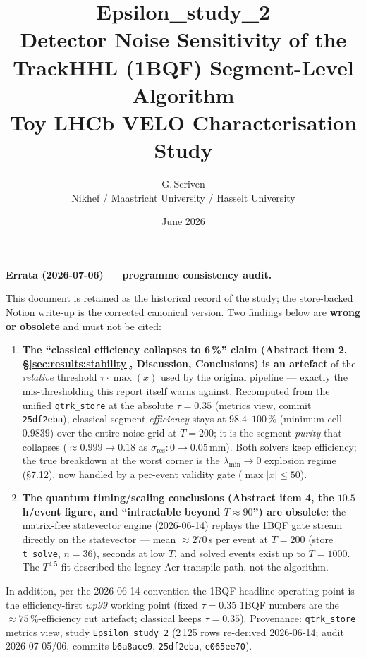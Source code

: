 \documentclass[11pt,a4paper]{article}
\title{%
  \textbf{Epsilon\_study\_2}\\[4pt]
  \large Detector Noise Sensitivity of the TrackHHL (1BQF)
  Segment-Level Algorithm\\[2pt]
  \normalsize Toy LHCb VELO Characterisation Study
}
\author{G.\,Scriven\\[2pt]
  \small Nikhef / Maastricht University / Hasselt University}
\date{June 2026}
\newcommand{\sres}{\sigma_{\mathrm{res}}}
\newcommand{\ntrk}{T}
\newcommand{\codepath}[1]{\texttt{#1}}
\begin{document}
\maketitle
\thispagestyle{fancy}

\begin{center}
\setlength{\fboxsep}{8pt}%
\colorbox{red!8}{\begin{minipage}{0.86\linewidth}
\textbf{Errata (2026-07-06) — programme consistency audit.}\par\smallskip
This document is retained as the historical record of the study; the store-backed
Notion write-up is the corrected canonical version. Two findings below are
\textbf{wrong or obsolete} and must not be cited:
\begin{enumerate}[noitemsep,topsep=2pt]
  \item \textbf{The ``classical efficiency collapses to 6\,\%'' claim (Abstract item 2,
        \S\ref{sec:results:stability}, Discussion, Conclusions) is an artefact} of the
        \emph{relative} threshold $\tau\cdot\max(x)$ used by the original pipeline —
        exactly the mis-thresholding this report itself warns against. Recomputed from
        the unified \codepath{qtrk\_store} at the absolute $\tau=0.35$ (metrics view,
        commit \codepath{25df2eba}), classical segment \emph{efficiency} stays at
        $98.4$--$100\,\%$ (minimum cell $0.9839$) over the entire noise grid at
        $\ntrk=200$; it is the segment
        \emph{purity} that collapses ($\approx\!0.999 \to 0.18$ as
        $\sres\!: 0 \to 0.05\,$mm). Both solvers keep efficiency; the true breakdown
        at the worst corner is the $\lambda_{\min}\!\to\!0$ explosion regime
        (\S7.12), now handled by a per-event validity gate ($\max|x|\leq 50$).
  \item \textbf{The quantum timing/scaling conclusions (Abstract item 4, the
        $10.5\,$h/event figure, and ``intractable beyond $\ntrk\approx 90$'') are
        obsolete}: the matrix-free statevector engine (2026-06-14) replays the 1BQF
        gate stream directly on the statevector — mean $\approx\!270\,$s per event at
        $\ntrk=200$ (store \codepath{t\_solve}, $n{=}36$), seconds at low $T$, and
        solved events exist up to $\ntrk=1000$. The $\ntrk^{4.5}$ fit described the
        legacy Aer-transpile path, not the algorithm.
\end{enumerate}
\smallskip
In addition, per the 2026-06-14 convention the 1BQF headline operating point is the
efficiency-first \emph{wp99} working point (fixed $\tau=0.35$ 1BQF numbers are the
$\approx\!75\,\%$-efficiency cut artefact; classical keeps $\tau=0.35$).
Provenance: \codepath{qtrk\_store} metrics view, study \codepath{Epsilon\_study\_2}
(2\,125 rows re-derived 2026-06-14; audit 2026-07-05/06, commits
\codepath{b6a8ace9}, \codepath{25df2eba}, \codepath{e065ee70}).
\end{minipage}}
\end{center}
\end{document}
